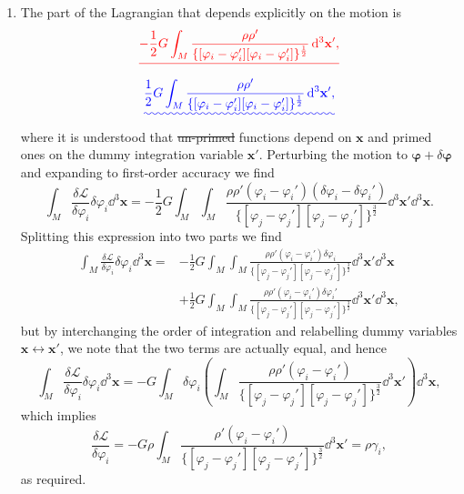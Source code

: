 \documentclass[a4paper,10pt]{paper}
\providecommand{\DIFadd}[1]{{\protect\color{blue}\uwave{#1}}} %
\providecommand{\DIFdel}[1]{{\protect\color{red}\sout{#1}}}                      %
\providecommand{\DIFaddbegin}{} %
\providecommand{\DIFaddend}{} %
\providecommand{\DIFdelbegin}{} %
\providecommand{\DIFdelend}{} %
\begin{document}
\begin{enumerate}
\item The part of the Lagrangian that depends explicitly on the motion is
\DIFdelbegin \begin{displaymath}
    \DIFdel{-\frac{1}{2}G\int_{M}\frac{\rho\rho'}{\{[\varphi_{i}-\varphi_{i}'][ \varphi_{i}-\varphi_{i}']\}^{\frac{1}{2}}}\dd^{3}\mathbf{x}',
}\end{displaymath}%
\DIFdelend \DIFaddbegin \begin{equation*}
    \DIFadd{\frac{1}{2}G\int_{M}\frac{\rho\rho'}{\{[\varphi_{i}-\varphi_{i}'][ \varphi_{i}-\varphi_{i}']\}^{\frac{1}{2}}}\dd^{3}\mathbf{x}',
}\end{equation*}\DIFaddend 
where it is understood that \DIFdelbegin \DIFdel{un-primed }\DIFdelend \DIFaddbegin \DIFadd{unprimed }\DIFaddend functions depend on $\mathbf{x}$ and primed ones on the dummy integration variable $\mathbf{x}'$. Perturbing the motion to \DIFdelbegin \DIFdel{$\boldsymbol{\varphi}+\delta\boldsymbol{\varphi}$ }\DIFdelend \DIFaddbegin \DIFadd{$\bphi+\delta\bphi$ }\DIFaddend and expanding to first-order accuracy we find
\begin{equation*}
    \int_{M}\frac{\delta\mathcal{L}}{\delta\varphi_{i}}\delta\varphi_{i}\dd^{3}\mathbf{x}=-\frac{1}{2}G\int_{M}\int_{M}\frac{\rho\rho'(\varphi_{i}-\varphi_{i}')(\delta\varphi_{i}-\delta\varphi_{i}')}{\{[\varphi_{j}-\varphi_{j}'][ \varphi_{j}-\varphi_{j}']\}^{\frac{3}{2}}}\dd^{3}\mathbf{x}'\dd^{3}\mathbf{x}.
\end{equation*}
Splitting this expression into two parts we find
\begin{align*}
    \int_{M}\frac{\delta\mathcal{L}}{\delta\varphi_{i}}\delta\varphi_{i}\dd^{3}\mathbf{x} = &-\frac{1}{2}G\int_{M}\int_{M}\frac{\rho\rho'(\varphi_{i}-\varphi_{i}')\delta\varphi_{i}}{\{[\varphi_{j}-\varphi_{j}'][ \varphi_{j}-\varphi_{j}']\}^{\frac{3}{2}}}\dd^{3}\mathbf{x}'\dd^{3}\mathbf{x} \\
    &+\frac{1}{2}G\int_{M}\int_{M}\frac{\rho\rho'(\varphi_{i}-\varphi_{i}')\delta\varphi_{i}'}{\{[\varphi_{j}-\varphi_{j}'][ \varphi_{j}-\varphi_{j}']\}^{\frac{3}{2}}}\dd^{3}\mathbf{x}'\dd^{3}\mathbf{x},
\end{align*}
but by interchanging the order of integration and relabelling dummy variables $\mathbf{x} \leftrightarrow \mathbf{x}'$, we note that the two terms are actually equal, and hence
\begin{equation*}
    \int_{M}\frac{\delta\mathcal{L}}{\delta\varphi_{i}}\delta\varphi_{i}\dd^{3}\mathbf{x}=-G\int_{M}\delta\varphi_{i} \left( \int_{M}\frac{\rho\rho'(\varphi_{i}-\varphi_{i}')}{\{[\varphi_{j}-\varphi_{j}'][ \varphi_{j}-\varphi_{j}']\}^{\frac{3}{2}}}\dd^{3}\mathbf{x}' \right) \dd^{3}\mathbf{x},
\end{equation*}
which implies
\begin{equation*}
    \frac{\delta\mathcal{L}}{\delta\varphi_{i}}=-G\rho\int_{M}\frac{\rho'(\varphi_{i}-\varphi_{i}')}{\{[\varphi_{j}-\varphi_{j}'][ \varphi_{j}-\varphi_{j}']\}^{\frac{3}{2}}}\dd^{3}\mathbf{x}'=\rho\gamma_{i},
\end{equation*}
as required.


\end{enumerate}
\end{document}
